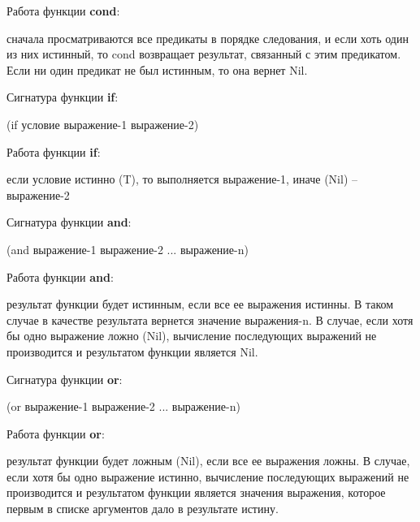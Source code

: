 \documentclass[12pt]{report}
\begin{document}
\begin{enumerate}[wide=0pt]
\indent Работа функции \textbf{cond}: 

сначала просматриваются все предикаты в порядке следования, и если хоть один из них истинный, то cond возвращает результат, связанный с этим предикатом. Если ни один предикат не был истинным, то она вернет Nil. 

Сигнатура функции \textbf{if}: 

(if условие выражение-1 выражение-2)\newline

\indent Работа функции \textbf{if}: 

если условие истинно (T), то выполняется выражение-1, иначе (Nil) – выражение-2\newline

Сигнатура функции \textbf{and}: 

(and выражение-1 выражение-2 ... выражение-n)\newline

\indent Работа функции \textbf{and}: 

результат функции будет истинным, если все ее выражения истинны. В таком случае в качестве результата вернется значение выражения-n. В случае, если хотя бы одно выражение ложно (Nil), вычисление последующих выражений не производится и результатом функции является Nil.\newline

Сигнатура функции \textbf{or}: 

(or выражение-1 выражение-2 ... выражение-n)\newline

Работа функции \textbf{or}: 

результат функции будет ложным (Nil), если все ее выражения ложны. В случае, если хотя бы одно выражение истинно, вычисление последующих выражений не производится и результатом функции является значения выражения, которое первым в списке аргументов дало в результате истину.\newline
\end{enumerate}
	
	
	
\end{document}
